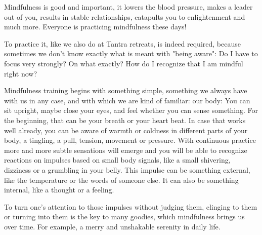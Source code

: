 \vspace{0.2cm}

Mindfulness is good and important, it lowers the blood pressure, makes a leader out of you, results in stable relationships, catapults you to enlightenment and much more. Everyone is practicing mindfulness these days!

To practice it, like we also do at Tantra retreats, is indeed required, because sometimes we don't know exactly what is meant with "being aware": Do I have to focus very strongly? On what exactly? How do I recognize that I am mindful right now?

Mindfulness training begins with something simple, something we always have with us in any case, and with which we are kind of familiar: our body: You can sit upright, maybe close your eyes, and feel whether you can sense something. For the beginning, that can be your breath or your heart beat. In case that works well already, you can be aware of warmth or coldness in different parts of your body, a tingling, a pull, tension, movement or pressure. With continuous practice more and more subtle sensations will emerge and you will be able to recognize reactions on impulses based on small body signals, like a small shivering, dizziness or a grumbling in your belly. This impulse can be something external, like the temperature or the words of someone else. It can also be something internal, like a thought or a feeling.

To turn one's attention to those impulses without judging them, clinging to them or turning into them is the key to many goodies, which mindfulness brings us over time. For example, a merry and unshakable serenity in daily life.
